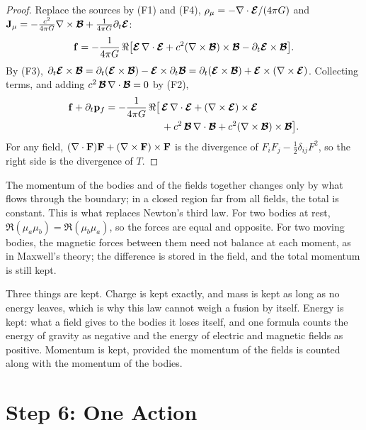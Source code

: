 \begin{proof}
Replace the sources by (F1) and (F4), $\rho_\mu = -\nabla\cdot\boldsymbol{\mathcal{E}}/(4\pi G)$ and $\mathbf{J}_\mu = -\frac{c^2}{4\pi G}\nabla\times\boldsymbol{\mathcal{B}} + \frac{1}{4\pi G}\partial_t\boldsymbol{\mathcal{E}}$:
\[
\mathbf{f} = -\frac{1}{4\pi G}\,\Re\bigl[\boldsymbol{\mathcal{E}}\,\nabla\cdot\boldsymbol{\mathcal{E}} + c^2(\nabla\times\boldsymbol{\mathcal{B}})\times\boldsymbol{\mathcal{B}} - \partial_t\boldsymbol{\mathcal{E}}\times\boldsymbol{\mathcal{B}}\bigr] .
\]
By (F3), $\partial_t\boldsymbol{\mathcal{E}}\times\boldsymbol{\mathcal{B}} = \partial_t(\boldsymbol{\mathcal{E}}\times\boldsymbol{\mathcal{B}}) - \boldsymbol{\mathcal{E}}\times\partial_t\boldsymbol{\mathcal{B}} = \partial_t(\boldsymbol{\mathcal{E}}\times\boldsymbol{\mathcal{B}}) + \boldsymbol{\mathcal{E}}\times(\nabla\times\boldsymbol{\mathcal{E}})$. Collecting terms, and adding $c^2\,\boldsymbol{\mathcal{B}}\,\nabla\cdot\boldsymbol{\mathcal{B}} = 0$ by (F2),
\begin{align*}
\mathbf{f} + \partial_t\mathbf{p}_f = -\frac{1}{4\pi G}\,\Re\bigl[\,&\boldsymbol{\mathcal{E}}\,\nabla\cdot\boldsymbol{\mathcal{E}} + (\nabla\times\boldsymbol{\mathcal{E}})\times\boldsymbol{\mathcal{E}}\\
&+ c^2\,\boldsymbol{\mathcal{B}}\,\nabla\cdot\boldsymbol{\mathcal{B}} + c^2(\nabla\times\boldsymbol{\mathcal{B}})\times\boldsymbol{\mathcal{B}}\bigr] .
\end{align*}
For any field, $(\nabla\cdot\mathbf{F})\mathbf{F} + (\nabla\times\mathbf{F})\times\mathbf{F}$ is the divergence of $F_iF_j - \tfrac12\delta_{ij}F^2$, so the right side is the divergence of $T$.
\end{proof}

The momentum of the bodies and of the fields together changes only by what flows through the boundary; in a closed region far from all fields, the total is constant. This is what replaces Newton's third law. For two bodies at rest, $\Re(\mu_a\mu_b) = \Re(\mu_b\mu_a)$, so the forces are equal and opposite. For two moving bodies, the magnetic forces between them need not balance at each moment, as in Maxwell's theory; the difference is stored in the field, and the total momentum is still kept.

\begin{plainwords}
Three things are kept. Charge is kept exactly, and mass is kept as long as no energy leaves, which is why this law cannot weigh a fusion by itself. Energy is kept: what a field gives to the bodies it loses itself, and one formula counts the energy of gravity as negative and the energy of electric and magnetic fields as positive. Momentum is kept, provided the momentum of the fields is counted along with the momentum of the bodies.
\end{plainwords}

\section{Step 6: One Action}\label{sec:un-action}

